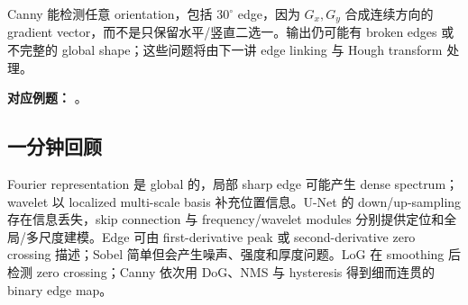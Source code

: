 Canny 能检测任意 orientation，包括 $30^\circ$ edge，因为 $G_x,G_y$ 合成连续方向的 gradient vector，而不是只保留水平/竖直二选一。输出仍可能有 broken edges 或不完整的 global shape；这些问题将由下一讲 edge linking 与 Hough transform 处理。

\textbf{对应例题：}
。

\subsection{一分钟回顾}

Fourier representation 是 global 的，局部 sharp edge 可能产生 dense spectrum；wavelet 以 localized multi-scale basis 补充位置信息。U-Net 的 down/up-sampling 存在信息丢失，skip connection 与 frequency/wavelet modules 分别提供定位和全局/多尺度建模。Edge 可由 first-derivative peak 或 second-derivative zero crossing 描述；Sobel 简单但会产生噪声、强度和厚度问题。LoG 在 smoothing 后检测 zero crossing；Canny 依次用 DoG、NMS 与 hysteresis 得到细而连贯的 binary edge map。

